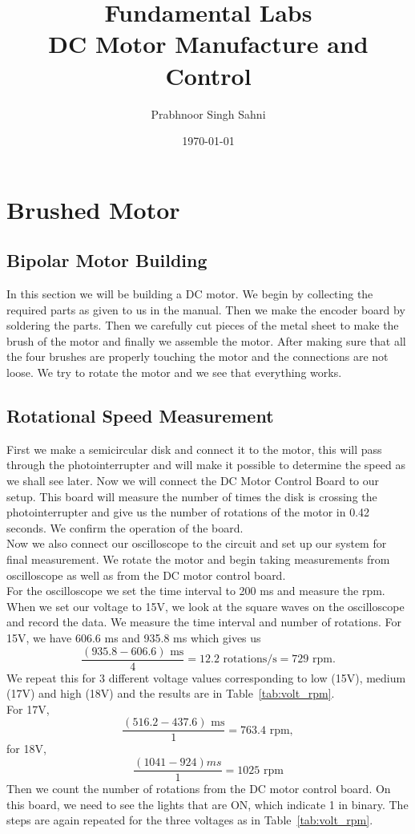\documentclass[12pt,a4paper]{report}
\title{Fundamental Labs\\DC Motor Manufacture and Control}
\author{Prabhnoor Singh Sahni}
\date{\today}
\begin{document}
\maketitle
\tableofcontents

\chapter{Brushed Motor}
\section{Bipolar Motor Building}
In this section we will be building a DC motor. We begin by collecting the required parts as given to us in the manual.
Then we make the encoder board by soldering the parts. Then we carefully cut pieces of the metal sheet to make the brush of the motor and finally we assemble the motor. After making sure that all the four brushes are properly touching the motor and the connections are not loose. We try to rotate the motor and we see that everything works.
\section{Rotational Speed Measurement}
First we make a semicircular disk and connect it to the motor, this will pass through the photointerrupter and will make it possible to determine the speed as we shall see later.
Now we will connect the DC Motor Control Board to our setup. This board will measure the number of times the disk is crossing the photointerrupter and give us the number of rotations of the motor in 0.42 seconds. We confirm the operation of the board. \\
Now we also connect our oscilloscope to the circuit and set up our system for final measurement. We rotate the motor and begin taking measurements from oscilloscope as well as from the DC motor control board. \\
For the oscilloscope we set the time interval to 200 ms and measure the rpm.
When we set our voltage to 15V, we look at the square waves on the oscilloscope and record the data. We measure the time interval and number of rotations. For 15V, we have 606.6 ms and 935.8 ms which gives us \[\frac{(935.8-606.6)\text{ ms}}{4}=12.2\text{ rotations/s}=729\text{ rpm}.\]
We repeat this for 3 different voltage values corresponding to low (15V), medium (17V) and high (18V) and the results are in 
Table~\ref{tab:volt_rpm}.\\
For 17V, \[\frac{(516.2-437.6)\text{ ms}}{1}=763.4\text{ rpm},\]
for 18V, \begin{equation}\frac{(1041-924)ms}{1} = 1025\text{ rpm}\end{equation}
Then we count the number of rotations from the DC motor control board. On this board, we need to see the lights that are ON, which indicate 1 in binary. The steps are again repeated for the three voltages as in Table~\ref{tab:volt_rpm}. \\
\end{document}
